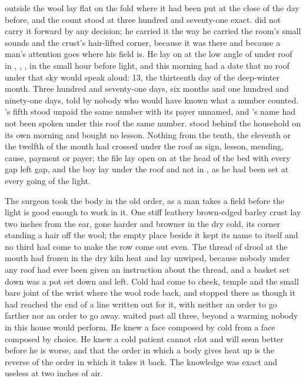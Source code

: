 
 outside the wool lay flat on the fold where it had been put at the close of the day before, and the count stood at three hundred and seventy-one exact.  did not carry it forward by any decision; he carried it the way he carried the room's small sounds and the crust's hair-lifted corner, because it was there and because a man's attention goes where his field is. He lay on  at the low angle of  under  roof in , , , in the small hour before light, and this morning had a date that no roof under that sky would speak aloud:  13, the thirteenth day of the deep-winter month. Three hundred and seventy-one days, six months and one hundred and ninety-one days, told by nobody who would have known what a number counted. 's fifth stood unpaid the same number with its payer unnamed, and 's name had not been spoken under this roof the same number.  stood behind the household on its own morning and bought no lesson. Nothing from the tenth, the eleventh or the twelfth of the month had crossed under the roof as sign, lesson, mending, cause, payment or payer; the file lay open on  at the head of the bed with every gap left gap, and the boy lay under the roof and not in , as he had been set at every going of the light.

The surgeon took the body in the old order, as a man takes a field before the light is good enough to work in it. One stiff leathery brown-edged barley crust lay two inches from the ear, gone harder and browner in the dry cold, its corner standing a hair off the wool; the empty place beside it kept its name to itself and no third had come to make the row come out even. The thread of drool at the mouth had frozen in the dry kiln heat and lay unwiped, because nobody under any roof had ever been given an instruction about the thread, and a basket set down was a pot set down and left. Cold had come to cheek, temple and the small bare joint of the wrist where the wool rode back, and stopped there as though it had reached the end of a line written out for it, with neither an order to go farther nor an order to go away.  waited past all three, beyond a warming nobody in this house would perform. He knew a face composed by cold from a face composed by choice. He knew a cold patient cannot clot and will seem better before he is worse, and that the order in which a body gives heat up is the reverse of the order in which it takes it back. The knowledge was exact and useless at two inches of air.


